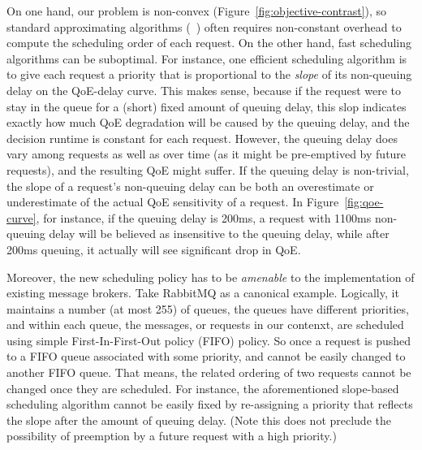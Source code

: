 On one hand, our problem is non-convex (Figure~\ref{fig:objective-contrast}), so standard approximating
algorithms (\eg~\cite{udell2013maximizing}) often requires non-constant overhead to compute the scheduling order of each request. 
On the other hand, fast scheduling algorithms can be suboptimal. 
For instance, one efficient scheduling algorithm is to give each request a priority that is proportional to the {\em slope} of its non-queuing delay on the QoE-delay curve. 
This makes sense, because if the request were to stay in the queue for a (short) fixed amount of queuing delay, this slop indicates exactly how much QoE degradation will be caused by the queuing delay, and the decision runtime is constant for each request.
However, the queuing delay does vary among requests as well as over time (as it might be pre-emptived by future requests), and the resulting QoE might suffer.
If the queuing delay is non-trivial, the slope of a request's non-queuing delay can be both an overestimate or underestimate of the actual QoE sensitivity of a request. 
In Figure~\ref{fig:qoe-curve}, for instance, if the queuing delay is 200ms, a request with 1100ms non-queuing delay will be believed as insensitive to the queuing delay, while after 200ms queuing, it actually will see significant drop in QoE. 


Moreover, the new scheduling policy has to be {\em amenable} to the implementation of existing message brokers. 
Take RabbitMQ as a canonical example. 
Logically, it maintains a number (at most 255) of queues, the queues have different priorities, and within each queue, the messages, or requests in our contenxt, are scheduled using simple First-In-First-Out policy (FIFO) policy.
So once a request is pushed to a FIFO queue associated with some priority, and cannot be easily changed to another FIFO queue. 
That means, the related ordering of two requests cannot be changed once they are scheduled.
For instance, the aforementioned slope-based scheduling algorithm cannot be easily fixed by re-assigning a priority that reflects the slope after the amount of queuing delay.
(Note this does not preclude the possibility of preemption by a future request with a high priority.)


